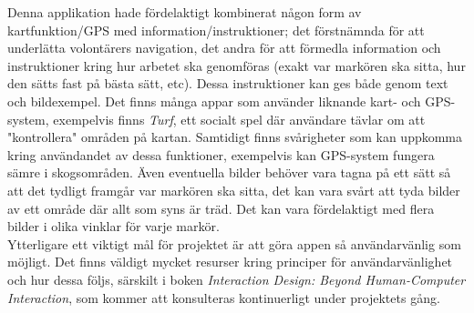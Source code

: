 \noindent Denna applikation hade fördelaktigt kombinerat någon form av kartfunktion/GPS med information/instruktioner; det förstnämnda för att underlätta volontärers navigation, det andra för att förmedla information och instruktioner kring hur arbetet ska genomföras (exakt var markören ska sitta, hur den sätts fast på bästa sätt, etc). Dessa instruktioner kan ges både genom text och bildexempel. Det finns många appar som använder liknande kart- och GPS-system, exempelvis finns \textit{Turf}\cite{turf}, ett socialt spel där användare tävlar om att "kontrollera" områden på kartan. Samtidigt finns svårigheter som kan uppkomma kring användandet av dessa funktioner, exempelvis kan GPS-system fungera sämre i skogsområden. Även eventuella bilder behöver vara tagna på ett sätt så att det tydligt framgår var markören ska sitta, det kan vara svårt att tyda bilder av ett område där allt som syns är träd. Det kan vara fördelaktigt med flera bilder i olika vinklar för varje markör. \\

\noindent Ytterligare ett viktigt mål för projektet är att göra appen så användarvänlig som möjligt. Det finns väldigt mycket resurser kring principer för användarvänlighet och hur dessa följs, särskilt i boken \textit{Interaction Design: Beyond Human-Computer Interaction}\cite{preece2015interaction}, som kommer att konsulteras kontinuerligt under projektets gång. 

